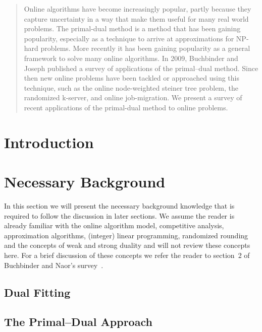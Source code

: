 \documentclass[10pt]{article}
\begin{document}
\maketitle

\begin{abstract}
Online algorithms have become increasingly popular, partly because they capture uncertainty in a way that make them useful for many real world problems. The primal-dual method is a method that has been gaining popularity, especially as a technique to arrive at approximations for NP-hard problems.  More recently it has been gaining popularity as a general framework to solve many online algorithms. In 2009, Buchbinder and Joseph published a survey of applications of the primal--dual method. Since then new online problems have been tackled or approached using this technique, such as the online node-weighted steiner tree problem, the randomized k-server, and online job-migration. We present a survey of recent applications of the primal-dual method to online problems.
\end{abstract}

\section{Introduction}

\section{Necessary Background}

In this section we will present the necessary background knowledge that is required to follow the discussion in later sections. We assume the reader is already familiar with the online algorithm model, competitive analysis, approximation algorithms, (integer) linear programming, randomized rounding and the concepts of weak and strong duality and will not review these concepts here. For a brief discussion of these concepts we refer the reader to section~2 of Buchbinder and Naor's survey~\cite{buchbinder09:survey}.

\subsection{Dual Fitting}

\subsection{The Primal--Dual Approach}
\end{document}
